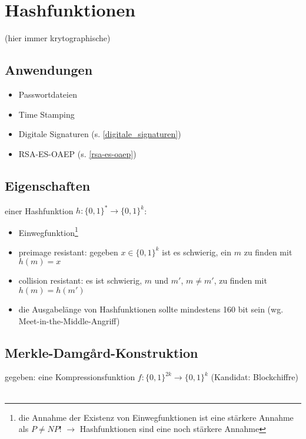 \documentclass[a4paper,twoside,DIV15,BCOR12mm]{scrbook}
\begin{document}
\chapter{Hashfunktionen}

(hier immer krytographische)

\section{Anwendungen}

\begin{itemize}
	\item Passwortdateien
	\item Time Stamping
	\item Digitale Signaturen (s. \ref{digitale_signaturen})
	\item RSA-ES-OAEP (s. \ref{rsa-es-oaep})
\end{itemize}

\section{Eigenschaften}

einer Hashfunktion $h \colon {\{ 0, 1 \}}^* \rightarrow {\{ 0, 1 \}}^k$:

\begin{itemize}
	\item Einwegfunktion\footnote{die Annahme der Existenz von Einwegfunktionen ist eine stärkere Annahme als $P \neq NP$! $\rightarrow$ Hashfunktionen sind eine noch stärkere Annahme}
	\item preimage resistant: gegeben $x \in {\{ 0, 1 \}}^k$ ist es schwierig, ein $m$ zu finden mit $h(m) = x$
	\item collision resistant: es ist schwierig, $m$ und $m'$, $m \neq m'$, zu finden mit $h(m) = h(m')$
	\item die Ausgabelänge von Hashfunktionen sollte mindestens 160 bit sein (wg. Meet-in-the-Middle-Angriff)
\end{itemize}

\section{Merkle-Damg\r{a}rd-Konstruktion}

gegeben: eine Kompressionsfunktion $f \colon {\{ 0, 1 \}}^{2k} \rightarrow {\{ 0, 1 \}}^k$ (Kandidat: Blockchiffre)\\

\\
\end{document}
